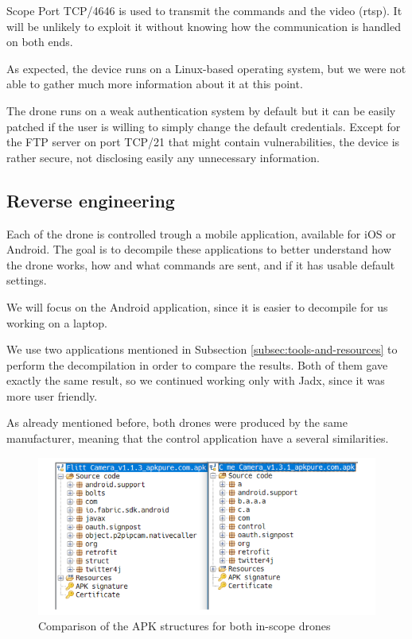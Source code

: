 \begin{chaptercover}{Scope}
Port TCP/4646 is used to transmit the commands and the video (\acrshort{rtsp}). It will be unlikely to exploit it without knowing how the communication is handled on both ends.

As expected, the device runs on a Linux-based operating system, but we were not able to gather much more information about it at this point.

\begin{tip}
The drone runs on a weak authentication system by default but it can be easily patched if the user is willing to simply change the default credentials.
Except for the FTP server on port TCP/21 that might contain vulnerabilities, the device is rather secure, not disclosing easily any unnecessary information.
\end{tip}

\subsection{Reverse engineering}\label{subsec:reverse-engineering}

Each of the drone is controlled trough a mobile application, available for iOS or Android. The goal is to decompile these applications to better understand how the drone works, how and what commands are sent, and if it has usable default settings.

We will focus on the Android application, since it is easier to decompile for us working on a laptop. 

We use two applications mentioned in Subsection \ref{subsec:tools-and-resources} to perform the decompilation in order to compare the results. Both of them gave exactly the same result, so we continued working only with Jadx, since it was more user friendly.

As already mentioned before, both drones were produced by the same manufacturer, meaning that the control application have a several similarities.

\begin{figure}[H]
  \centering
  \includegraphics[width=\linewidth]{figures/apk-comparison}
  \caption{Comparison of the APK structures for both in-scope drones}
  \label{fig:apk-comparison}
\end{figure}


\end{chaptercover}
